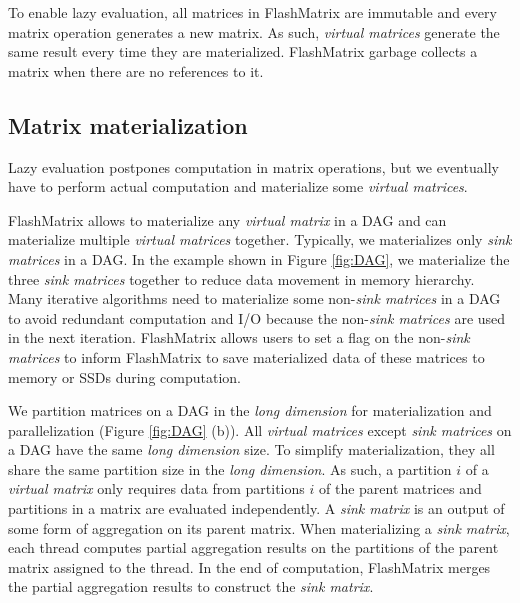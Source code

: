 To enable lazy evaluation, all matrices in FlashMatrix are immutable and every
matrix operation generates a new matrix. As such, \textit{virtual matrices}
generate the same result every time they are materialized. FlashMatrix
garbage collects a matrix when there are no references to it.

\subsection{Matrix materialization} \label{sec:materialize}
Lazy evaluation postpones computation in matrix operations, but we eventually
have to perform actual computation and materialize some \textit{virtual matrices}.

FlashMatrix allows to materialize any \textit{virtual matrix} in a DAG and
can materialize multiple \textit{virtual matrices} together. Typically, we
materializes only \textit{sink matrices} in a DAG. In the example shown in
Figure \ref{fig:DAG}, we materialize the three \textit{sink matrices} together
to reduce data movement in memory hierarchy. Many iterative algorithms need
to materialize some non-\textit{sink matrices} in a DAG to avoid redundant
computation and I/O because the non-\textit{sink matrices} are used
in the next iteration. FlashMatrix allows users to set a flag on the
non-\textit{sink matrices} to inform FlashMatrix to save materialized data
of these matrices to memory or SSDs during computation.

We partition matrices on a DAG in the \textit{long dimension} for materialization
and parallelization (Figure \ref{fig:DAG} (b)). All \textit{virtual matrices}
except \textit{sink matrices} on a DAG have the same \textit{long dimension}
size. To simplify materialization, they all share the same partition size in
the \textit{long dimension}.
As such, a partition $i$ of a \textit{virtual matrix} only requires data from
partitions $i$ of the parent matrices and partitions in a matrix are
evaluated independently. %
A \textit{sink matrix} is an output of some form of aggregation on its parent
matrix. When materializing a \textit{sink matrix}, each thread computes partial
aggregation results on the partitions of the parent matrix assigned to the thread.
In the end of computation, FlashMatrix merges the partial aggregation results to
construct the \textit{sink matrix}.

